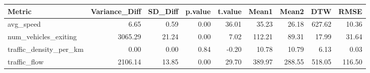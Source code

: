 \begin{table}[ht]
\centering
\begin{tabular}{lrrrrrrrr}
  \hline
Metric & Variance\_Diff & SD\_Diff & p.value & t.value & Mean1 & Mean2 & DTW & RMSE \\ 
  \hline
avg\_speed & 6.65 & 0.59 & 0.00 & 36.01 & 35.23 & 26.18 & 627.62 & 10.36 \\ 
  num\_vehicles\_exiting & 3065.29 & 21.24 & 0.00 & 7.02 & 112.21 & 89.31 & 17.99 & 31.64 \\ 
  traffic\_density\_per\_km & 0.00 & 0.00 & 0.84 & -0.20 & 10.78 & 10.79 & 6.13 & 0.03 \\ 
  traffic\_flow & 2106.14 & 13.85 & 0.00 & 29.70 & 389.97 & 288.55 & 518.05 & 116.50 \\ 
   \hline
\end{tabular}
\end{table}
